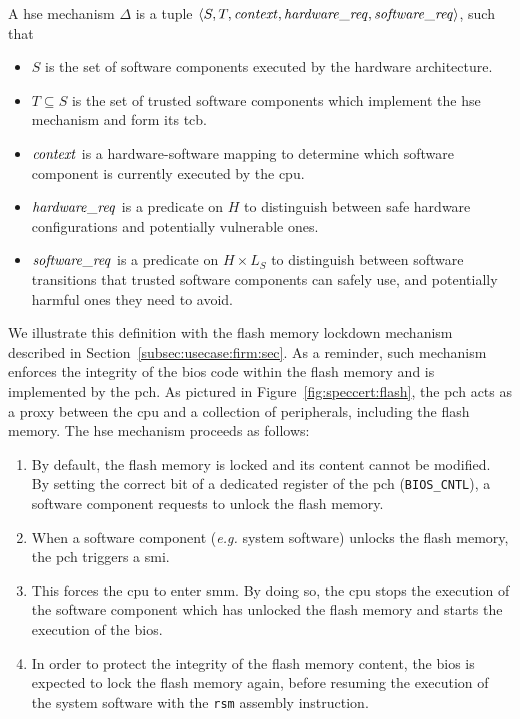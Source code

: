 \begin{definition}
  \label{def:speccert:hse}
  A \ac{hse} mechanism $\Delta$ is a tuple
  $\langle S, T, \mathit{context}, \mathit{hardware\_req}, \mathit{software\_req}
  \rangle$, such that
  \begin{itemize}
  \item $S$ is the set of software components executed by the hardware
    architecture.
  \item $T \subseteq S$ is the set of trusted software components which
    implement the \ac{hse} mechanism and form its \ac{tcb}.
  \item $\mathit{context}$ is a hardware-software mapping to determine which
    software component is currently executed by the \ac{cpu}.
  \item $\mathit{hardware\_req}$ is a predicate on $H$ to distinguish between safe
    hardware configurations and potentially vulnerable ones.
  \item $\mathit{software\_req}$ is a predicate on $H \times L_S$ to distinguish
    between software transitions that trusted software components can safely
    use, and potentially harmful ones they need to avoid.
  \end{itemize}
\end{definition}

We illustrate this definition with the flash memory lockdown mechanism described
in Section~\ref{subsec:usecase:firm:sec}.
%
As a reminder, such mechanism enforces the integrity of the \ac{bios} code
within the flash memory and is implemented by the \ac{pch}.
%
As pictured in Figure~\ref{fig:speccert:flash}, the \ac{pch} acts as a proxy
between the \ac{cpu} and a collection of peripherals, including the flash
memory.
%
The \ac{hse} mechanism proceeds as follows:
%
\begin{enumerate}
\item By default, the flash memory is locked and its content cannot be modified.
  By setting the correct bit of a dedicated register of the \ac{pch}
  (\texttt{BIOS\_CNTL}), a software component requests to unlock the flash
  memory.
%
\item When a software component (\emph{e.g.} system software) unlocks the flash
  memory, the \ac{pch} triggers a \ac{smi}.
%
\item This forces the \ac{cpu} to enter \ac{smm}.
  By doing so, the \ac{cpu} stops the execution of the software component which
  has unlocked the flash memory and starts the execution of the \ac{bios}.
%
\item In order to protect the integrity of the flash memory content, the
  \ac{bios} is expected to lock the flash memory again, before resuming the
  execution of the system software with the \texttt{rsm} assembly instruction.
\end{enumerate}

